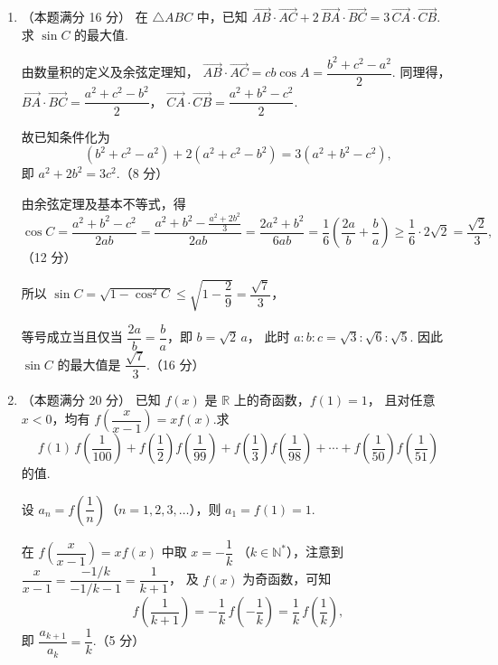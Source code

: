 \documentclass{chsmc}
\begin{document}
\begin{enumerate}[resume]
  \item （本题满分 16 分）
    在 $\triangle ABC$ 中，已知
    $\overrightarrow{AB} \cdot \overrightarrow{AC}
     + 2\,\overrightarrow{BA} \cdot \overrightarrow{BC}
     = 3\,\overrightarrow{CA} \cdot \overrightarrow{CB}$.
    求 $\sin C$ 的最大值.
    \begin{solution}
      由数量积的定义及余弦定理知，
      $\overrightarrow{AB} \cdot \overrightarrow{AC} = cb\cos A = \dfrac{b^2 + c^2 - a^2}{2}$.
      同理得，
      $\overrightarrow{BA} \cdot \overrightarrow{BC} = \dfrac{a^2 + c^2 - b^2}{2}$，\;
      $\overrightarrow{CA} \cdot \overrightarrow{CB} = \dfrac{a^2 + b^2 - c^2}{2}$.

      故已知条件化为
      \[
        (b^2 + c^2 - a^2) + 2(a^2 + c^2 - b^2) = 3(a^2 + b^2 - c^2),
      \]
      即 $a^2 + 2b^2 = 3c^2$.\hfill（8 分）

      由余弦定理及基本不等式，得
      \[
        \cos C = \frac{a^2 + b^2 - c^2}{2ab}
               = \frac{a^2 + b^2 - \frac{a^2 + 2b^2}{3}}{2ab}
               = \frac{2a^2 + b^2}{6ab}
               = \frac{1}{6}\!\left(\frac{2a}{b} + \frac{b}{a}\right)
               \geq \frac{1}{6} \cdot 2\sqrt{2}
               = \frac{\sqrt{2}}{3},
      \]\hfill（12 分）

      所以
      $\sin C = \sqrt{1 - \cos^2 C} \leq \sqrt{1 - \dfrac{2}{9}} = \dfrac{\sqrt{7}}{3}$，

      等号成立当且仅当 $\dfrac{2a}{b} = \dfrac{b}{a}$，即 $b = \sqrt{2}\,a$，
      此时 $a : b : c = \sqrt{3} : \sqrt{6} : \sqrt{5}$.
      因此 $\sin C$ 的最大值是 $\dfrac{\sqrt{7}}{3}$.\hfill（16 分）
    \end{solution}

  \item （本题满分 20 分）
    已知 $f(x)$ 是 $\mathbb{R}$ 上的奇函数，$f(1) = 1$，
    且对任意 $x < 0$，均有
    $f\!\left(\dfrac{x}{x-1}\right) = xf(x)$.求
    \[
      f(1)\,f\!\left(\frac{1}{100}\right)
      + f\!\left(\frac{1}{2}\right) f\!\left(\frac{1}{99}\right)
      + f\!\left(\frac{1}{3}\right) f\!\left(\frac{1}{98}\right)
      + \cdots
      + f\!\left(\frac{1}{50}\right) f\!\left(\frac{1}{51}\right)
    \]
    的值.
    \begin{solution}
      设 $a_n = f\!\left(\dfrac{1}{n}\right)$（$n = 1, 2, 3, \ldots$），则 $a_1 = f(1) = 1$.

      在 $f\!\left(\dfrac{x}{x-1}\right) = xf(x)$ 中取 $x = -\dfrac{1}{k}$
      （$k \in \mathbb{N}^*$），注意到
      $\dfrac{x}{x-1} = \dfrac{-1/k}{-1/k - 1} = \dfrac{1}{k+1}$，
      及 $f(x)$ 为奇函数，可知
      \[
        f\!\left(\frac{1}{k+1}\right)
        = -\frac{1}{k}\,f\!\left(-\frac{1}{k}\right)
        = \frac{1}{k}\,f\!\left(\frac{1}{k}\right),
      \]
      即 $\dfrac{a_{k+1}}{a_k} = \dfrac{1}{k}$.\hfill（5 分）


\end{solution}
\end{enumerate}
\end{document}
